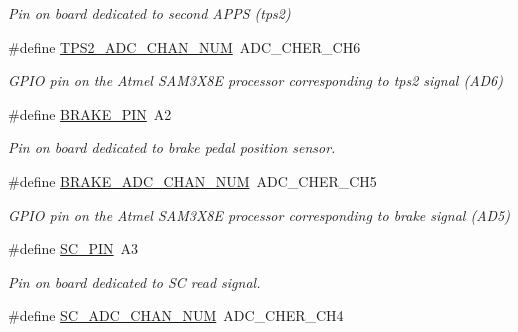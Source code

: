 \begin{DoxyCompactItemize}
\begin{DoxyCompactList}\small\item\em Pin on board dedicated to second A\-P\-P\-S (tps2) \end{DoxyCompactList}\item 
\hypertarget{group___board__model__group_ga4cecb8c10512873904099a1a88d69ed3}{\#define \hyperlink{group___board__model__group_ga4cecb8c10512873904099a1a88d69ed3}{T\-P\-S2\-\_\-\-A\-D\-C\-\_\-\-C\-H\-A\-N\-\_\-\-N\-U\-M}~A\-D\-C\-\_\-\-C\-H\-E\-R\-\_\-\-C\-H6}\label{group___board__model__group_ga4cecb8c10512873904099a1a88d69ed3}

\begin{DoxyCompactList}\small\item\em G\-P\-I\-O pin on the Atmel S\-A\-M3\-X8\-E processor corresponding to tps2 signal (A\-D6) \end{DoxyCompactList}\item 
\hypertarget{group___board__model__group_gad632b56bf4c6259a390c3db91607078e}{\#define \hyperlink{group___board__model__group_gad632b56bf4c6259a390c3db91607078e}{B\-R\-A\-K\-E\-\_\-\-P\-I\-N}~A2}\label{group___board__model__group_gad632b56bf4c6259a390c3db91607078e}

\begin{DoxyCompactList}\small\item\em Pin on board dedicated to brake pedal position sensor. \end{DoxyCompactList}\item 
\hypertarget{group___board__model__group_ga310547321c4a016c4ad19922920fadfd}{\#define \hyperlink{group___board__model__group_ga310547321c4a016c4ad19922920fadfd}{B\-R\-A\-K\-E\-\_\-\-A\-D\-C\-\_\-\-C\-H\-A\-N\-\_\-\-N\-U\-M}~A\-D\-C\-\_\-\-C\-H\-E\-R\-\_\-\-C\-H5}\label{group___board__model__group_ga310547321c4a016c4ad19922920fadfd}

\begin{DoxyCompactList}\small\item\em G\-P\-I\-O pin on the Atmel S\-A\-M3\-X8\-E processor corresponding to brake signal (A\-D5) \end{DoxyCompactList}\item 
\hypertarget{group___board__model__group_gabbdb157ae4ad39d102935c21fa30d1c5}{\#define \hyperlink{group___board__model__group_gabbdb157ae4ad39d102935c21fa30d1c5}{S\-C\-\_\-\-P\-I\-N}~A3}\label{group___board__model__group_gabbdb157ae4ad39d102935c21fa30d1c5}

\begin{DoxyCompactList}\small\item\em Pin on board dedicated to S\-C read signal. \end{DoxyCompactList}\item 
\hypertarget{group___board__model__group_ga564adb575db2620ac85e3abdd6a5bbaf}{\#define \hyperlink{group___board__model__group_ga564adb575db2620ac85e3abdd6a5bbaf}{S\-C\-\_\-\-A\-D\-C\-\_\-\-C\-H\-A\-N\-\_\-\-N\-U\-M}~A\-D\-C\-\_\-\-C\-H\-E\-R\-\_\-\-C\-H4}\label{group___board__model__group_ga564adb575db2620ac85e3abdd6a5bbaf}


\end{DoxyCompactItemize}
